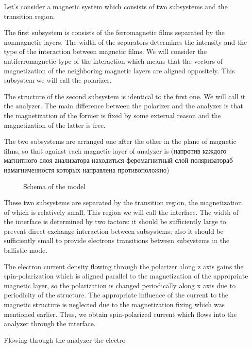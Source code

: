 \newpage

Let's consider a magnetic system which consists of two subsystems and the transition region.

The first subsystem is consists of the ferromagnetic films separated by the nonmagnetic layers. The width of the separators determines the intensity and the type of the interaction between magnetic films. We will consider the antiferromagnetic type of the interaction which means that the vectors of magnetization of the neighboring magnetic layers are aligned oppositely. This subsystem we will call the polarizer.

The structure of the second subsystem is identical to the first one. We will call it the analyzer. The main difference between the polarizer and the analyzer is that the magnetization of the former is fixed by some external reason and the magnetization of the latter is free.

The two subsystems are arranged one after the other in the plane of magnetic films, so that against each magnetic layer of analyzer is  (напротив каждого магнитного слоя анализатора находиться феромагнитный слой поляризатораб намагниченностя которых направлена противоположно)

\begin{figure}[h]
	\centering
	
	\caption{Schema of the model}
	\label{fig:model}
\end{figure}

These two subsystems are separated by the transition region, the magnetization of which is relatively small. This region we will call the interface. The width of the interface is determined by two factors: it should be sufficiently large to prevent direct exchange interaction between subsystems; also it should be sufficiently small to provide electrons transitions between subsystems in the ballistic mode.

The electron current density flowing through the polarizer along z axis gains the spin-polarization which is aligned parallel to the magnetization of the appropriate magnetic layer, so the polarization is changed periodically along x axis due to periodicity of the structure. The appropriate influence of the current to the magnetic structure is neglected due to the magnetization fixing which was mentioned earlier. Thus, we obtain spin-polarized current which flows into the analyzer through the interface.

Flowing through the analyzer the electro








